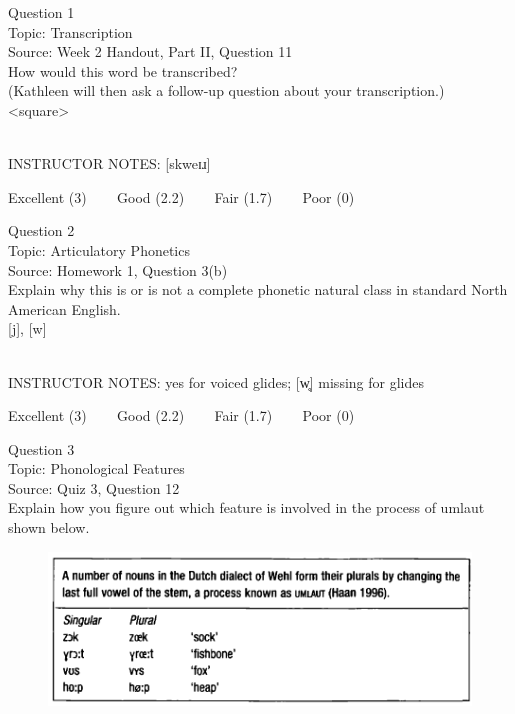 \documentclass[12pt]{article}
\begin{document}
\begin{center}
\textbf{{\color{blue}{\HUGE START OF EXAM\\}}}

\textbf{{\color{blue}{\HUGE Student ID: 37843\\}}}

\textbf{{\color{blue}{\HUGE \\}}}

\end{center}
\newpage

{\large Question 1}\\

Topic: Transcription\\
Source: Week 2 Handout, Part II, Question 11\\

How would this word be transcribed?\\ (Kathleen will then ask a follow-up question about your transcription.)\\

<square>


~\\
INSTRUCTOR NOTES: [skweɪɹ]


\vfill
Excellent (3) ~~~ Good (2.2) ~~~ Fair (1.7) ~~~ Poor (0)
\newpage

{\large Question 2}\\

Topic: Articulatory Phonetics\\
Source: Homework 1, Question 3(b)\\

Explain why this is or is not a complete phonetic natural class in standard North American English.\\

{[j]}, {[w]}


~\\
INSTRUCTOR NOTES: yes for voiced glides; [w̥] missing for glides


\vfill
Excellent (3) ~~~ Good (2.2) ~~~ Fair (1.7) ~~~ Poor (0)
\newpage

{\large Question 3}\\

Topic: Phonological Features\\
Source: Quiz 3, Question 12\\

Explain how you figure out which feature is involved in the process of umlaut shown below.\\

\begin{figure}[H]
\includegraphics{../images/dutch.png}
\end{figure}
\end{document}
